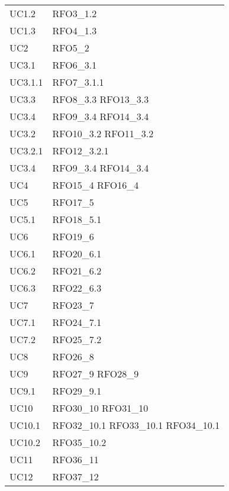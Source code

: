 \begin{longtable}{C{6cm} C{6cm}}
	UC1.2 & RFO3\_1.2 \\
	
	UC1.3 & RFO4\_1.3 \\
	
	UC2 & RFO5\_2 \\
	
	UC3.1 & RFO6\_3.1 \\
	
    UC3.1.1 & RFO7\_3.1.1 \\
    
    UC3.3 & RFO8\_3.3 \newline RFO13\_3.3 \\ 
    
    UC3.4 & RFO9\_3.4 \newline RFO14\_3.4 \\
    UC3.2 & RFO10\_3.2 \newline RFO11\_3.2 \\
    UC3.2.1 & RFO12\_3.2.1 \\
    UC3.4 & RFO9\_3.4 \newline RFO14\_3.4 \\
    UC4 & RFO15\_4 \newline RFO16\_4 \\
    UC5 & RFO17\_5 \\
    UC5.1 & RFO18\_5.1 \\
    UC6 & RFO19\_6 \\
    UC6.1 & RFO20\_6.1 \\
    UC6.2 & RFO21\_6.2 \\
    UC6.3 & RFO22\_6.3 \\
    UC7 & RFO23\_7 \\
    UC7.1 & RFO24\_7.1 \\
    UC7.2 & RFO25\_7.2 \\
    UC8 & RFO26\_8 \\
    UC9 & RFO27\_9 \newline RFO28\_9 \\
    UC9.1 & RFO29\_9.1 \\
    UC10 & RFO30\_10 \newline RFO31\_10 \\
    UC10.1 & RFO32\_10.1 \newline RFO33\_10.1 \newline RFO34\_10.1 \\
    UC10.2 & RFO35\_10.2 \\
    UC11 & RFO36\_11 \\
    UC12 & RFO37\_12 \\

\end{longtable}
